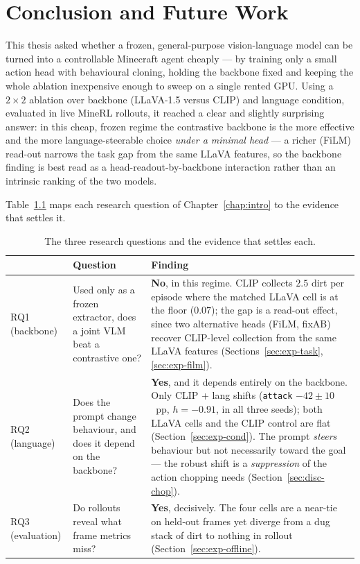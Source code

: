 \chapter{Conclusion and Future Work}
\label{chap:conclusion}

This thesis asked whether a frozen, general-purpose vision-language model can be
turned into a controllable Minecraft agent cheaply --- by training only a small
action head with behavioural cloning, holding the backbone fixed and keeping the
whole ablation inexpensive enough to sweep on a single rented GPU. Using a
$2\times2$ ablation over backbone (LLaVA-1.5 versus CLIP) and language condition,
evaluated in live MineRL rollouts, it reached a clear and slightly surprising
answer: in this cheap, frozen regime the contrastive backbone is the more
effective and the more language-steerable choice \emph{under a minimal head} --- a
richer (FiLM) read-out narrows the task gap from the same LLaVA features, so the
backbone finding is best read as a head-readout-by-backbone interaction rather
than an intrinsic ranking of the two models.

Table~\ref{tab:contributions} maps each research question of
Chapter~\ref{chap:intro} to the evidence that settles it.

\begin{table}[ht]
\centering
\begin{tabular}{p{}p{}p{}}
\hline
 & Question & Finding \\
\hline
RQ1 \newline (backbone) & Used only as a frozen extractor, does a joint VLM beat
a contrastive one? & \textbf{No}, in this regime. CLIP collects $2.5$ dirt per
episode where the matched LLaVA cell is at the floor ($0.07$); the gap is a
read-out effect, since two alternative heads (FiLM, fixAB) recover CLIP-level
collection from the same LLaVA features
(Sections~\ref{sec:exp-task}, \ref{sec:exp-film}). \\
RQ2 \newline (language) & Does the prompt change behaviour, and does it depend on
the backbone? & \textbf{Yes}, and it depends entirely on the backbone. Only
CLIP + lang shifts (\texttt{attack} $-42\pm10$~pp, $h=-0.91$, in all three seeds);
both LLaVA cells and the CLIP control are flat (Section~\ref{sec:exp-cond}). The
prompt \emph{steers} behaviour but not necessarily toward the goal --- the robust
shift is a \emph{suppression} of the action chopping needs
(Section~\ref{sec:disc-chop}). \\
RQ3 \newline (evaluation) & Do rollouts reveal what frame metrics miss? &
\textbf{Yes}, decisively. The four cells are a near-tie on held-out frames yet
diverge from a dug stack of dirt to nothing in rollout
(Section~\ref{sec:exp-offline}). \\
\hline
\end{tabular}
\caption{The three research questions and the evidence that settles each.}
\label{tab:contributions}
\end{table}

